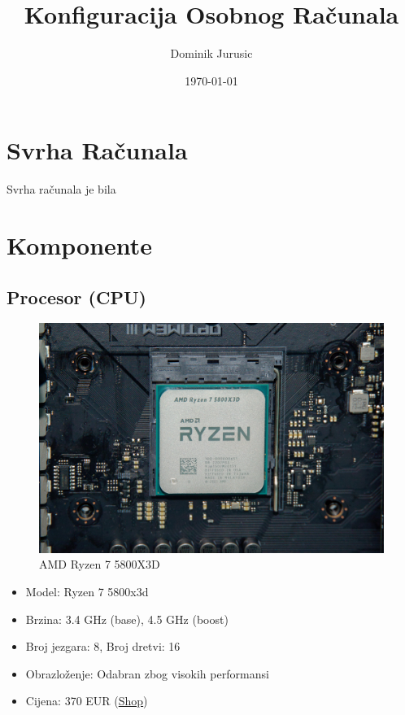 \documentclass{article}
\title{Konfiguracija Osobnog Računala}
\author{Dominik Jurusic}
\date{\today}
\begin{document}
\maketitle
\tableofcontents
\listoffigures
\pagebreak



\section{Svrha Računala}
Svrha računala je bila 

\section{Komponente}

\subsection{Procesor (CPU)}
\begin{figure}[H]
    \centering
    \includegraphics[scale=0.1]{Slike/CPU.jpg}
    \caption{AMD Ryzen 7 5800X3D}
    \label{fig:Procesor}
\end{figure}
\begin{itemize}
    \item Model: Ryzen 7 5800x3d
    \item Brzina: 3.4 GHz (base), 4.5 GHz (boost)
    \item Broj jezgara: 8, Broj dretvi: 16
    \item Obrazloženje: Odabran zbog visokih performansi 
    \item Cijena: 370 EUR (\href{https://www.adm.hr/cpu-amd-ryzen-7-5800x3d-box-am4-100-100000651wof/72892/product/}{Shop})
\end{itemize}
\end{document}
